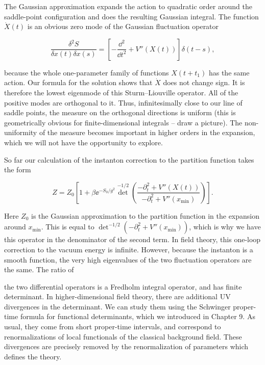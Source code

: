 The Gaussian approximation expands the action to quadratic order around the
saddle-point configuration and does the resulting Gaussian integral. The
function $\dot X(t)$ is an obvious zero mode of the Gaussian fluctuation
operator

\[
  \frac{\delta^2S}{\delta x(t)\delta x(s)}
  =\left[-\frac{\dd^2}{\dd t^2}+V''(X(t))\right]\delta(t-s),
\]

because the whole one-parameter family of functions $X(t+t_1)$ has the same
action. Our formula for the solution shows that $\dot X$ does not change sign.
It is therefore the lowest eigenmode of this Sturm--Liouville operator. All of
the positive modes are orthogonal to it. Thus, infinitesimally close to our line
of saddle points, the measure on the orthogonal directions is uniform (this is
geometrically obvious for finite-dimensional integrals -- draw a picture). The
non-uniformity of the measure becomes important in higher orders in the
expansion, which we will not have the opportunity to explore.

So far our calculation of the instanton correction to the partition function
takes the form

\[
  Z=Z_0\left[1+\beta\ee^{-S_0/g^2}
  \det^{-1/2}\left(\frac{-\partial_t^2+V''(X(t))}
  {-\partial_t^2+V''(x_{\min})}\right)\right].
\]

Here $Z_0$ is the Gaussian approximation to the partition function in the
expansion around $x_{\min}$. This is equal to
$\det^{-1/2}(-\partial_t^2+V''(x_{\min}))$, which is why we have this operator
in the denominator of the second term. In field theory, this one-loop
correction to the vacuum energy is infinite. However, because the instanton is a
smooth function, the very high eigenvalues of the two fluctuation operators are
the same. The ratio of

the two differential operators is a Fredholm integral operator, and has finite
determinant. In higher-dimensional field theory, there are additional UV
divergences in the determinant. We can study them using the Schwinger proper-time
formula for functional determinants, which we introduced in Chapter 9. As usual,
they come from short proper-time intervals, and correspond to renormalizations
of local functionals of the classical background field. These divergences are
precisely removed by the renormalization of parameters which defines the theory.

